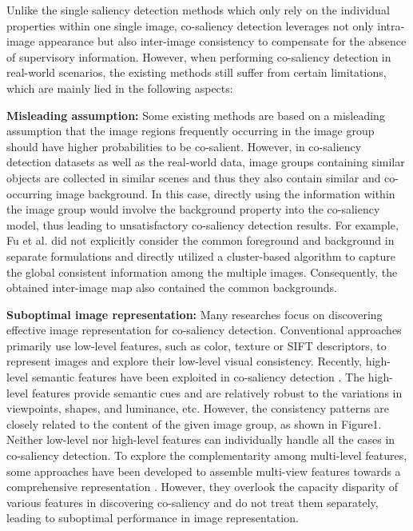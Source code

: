 \documentclass[sigconf]{acmart}
\begin{document}
Unlike the single saliency detection methods which only rely on the individual properties within one single image, co-saliency detection leverages not only intra-image appearance but also inter-image consistency to compensate for the absence of supervisory information. However, when performing co-saliency detection in real-world scenarios, the existing methods still suffer from certain limitations, which are mainly lied in the following aspects:

\noindent \textbf{Misleading assumption:} Some existing methods \cite{Fu2013, DBLP:journals/tmm/LiMN13, liu2014co} are based on a misleading assumption that the image regions frequently occurring in the image group should have higher probabilities to be co-salient. However, in co-saliency detection datasets as well as the real-world data, image groups containing similar objects are collected in similar scenes and thus they also contain similar and co-occurring image background. In this case, directly using the information within the image group would involve the background property into the co-saliency model, thus leading to unsatisfactory co-saliency detection results. For example, Fu et al. \cite{Fu2013} did not explicitly consider the common foreground and background in separate formulations and directly utilized a cluster-based algorithm to capture the global consistent  information among the multiple images. Consequently, the obtained inter-image map also contained the common backgrounds.

\noindent \textbf{Suboptimal image representation: }Many researches focus on discovering effective image representation for co-saliency detection. Conventional approaches primarily use low-level features, such as color, texture or SIFT descriptors, to represent images and explore their low-level visual consistency. Recently, high-level semantic features have been exploited in co-saliency detection \cite{DBLP:journals/tip/YaoHZN17,DBLP:conf/eccv/HsuTLQC18,Zhang2016}. The high-level features provide semantic cues and are relatively robust to the variations in viewpoints, shapes, and luminance, etc. However, the consistency patterns are closely related to the content of the given image group, as shown in Figure1. Neither low-level nor high-level features can individually handle all the cases in co-saliency detection. To explore the complementarity among multi-level features, some approaches have been developed to assemble multi-view features towards a comprehensive representation \cite{han2017unified,zhang2017co}. However, they overlook the capacity disparity of various features in discovering co-saliency and do not treat them separately, leading to suboptimal performance in image representation.
\end{document}
